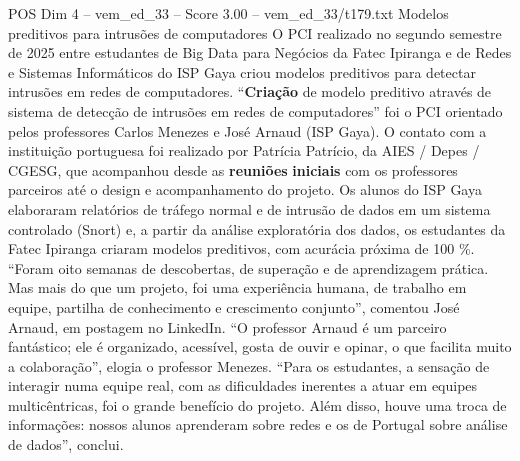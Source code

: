 \begin{textsample}{POS Dim 4 – vem\_ed\_33 – Score 3.00 – vem\_ed\_33/t179.txt}  \label{ex:f4_pos_127}
Modelos preditivos para intrusões de computadores O PCI realizado no segundo semestre de 2025 entre estudantes de Big Data para Negócios da Fatec Ipiranga e de Redes e Sistemas Informáticos do ISP Gaya criou modelos preditivos para detectar intrusões em redes de computadores. “\textbf{Criação} de modelo preditivo através de sistema de detecção de intrusões em redes de computadores” foi o PCI orientado pelos professores Carlos Menezes e José Arnaud (ISP Gaya).
O contato com a instituição portuguesa foi realizado por Patrícia Patrício, da AIES / Depes / CGESG, que acompanhou desde as \textbf{reuniões} \textbf{iniciais} com os professores parceiros até o design e acompanhamento do projeto.
Os alunos do ISP Gaya elaboraram relatórios de tráfego normal e de intrusão de dados em um sistema controlado (Snort) e, a partir da análise exploratória dos dados, os estudantes da Fatec Ipiranga criaram modelos preditivos, com acurácia próxima de 100 \%. “Foram oito semanas de descobertas, de superação e de aprendizagem prática.
Mas mais do que um projeto, foi uma experiência humana, de trabalho em equipe, partilha de conhecimento e crescimento conjunto”, comentou José Arnaud, em postagem no LinkedIn. “O professor Arnaud é um parceiro fantástico; ele é organizado, acessível, gosta de ouvir e opinar, o que facilita muito a colaboração”, elogia o professor Menezes. “Para os estudantes, a sensação de interagir numa equipe real, com as dificuldades inerentes a atuar em equipes multicêntricas, foi o grande benefício do projeto.
Além disso, houve uma troca de informações: nossos alunos aprenderam sobre redes e os de Portugal sobre análise de dados”, conclui.

\end{textsample}
